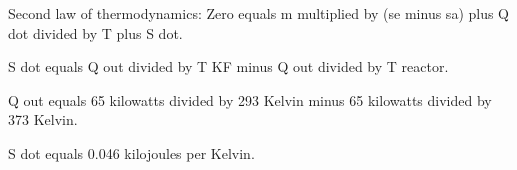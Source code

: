 Second law of thermodynamics:  
Zero equals m multiplied by (se minus sa) plus Q dot divided by T plus S dot.  

S dot equals Q out divided by T KF minus Q out divided by T reactor.  

Q out equals 65 kilowatts divided by 293 Kelvin minus 65 kilowatts divided by 373 Kelvin.  

S dot equals 0.046 kilojoules per Kelvin.